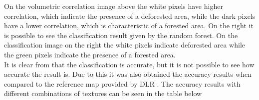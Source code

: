 On the volumetric correlation image above the white pixels have higher correlation, which indicate the presence of a deforested area, while the dark pixels have a lower correlation, which is characteristic of a forested area. On the right it is possible to see the classification result given by the random forest. On the classification image on the right the white pixels indicate deforested area while the green pixels indicate the presence of a forested area. \\
It is clear from  that the classification is accurate, but it is not possible to see how accurate the result is. Due to this it was also obtained the accuracy results when compared to the reference map provided by DLR %
. The accuracy results with different combinations of textures can be seen in the table below

